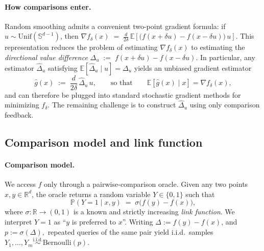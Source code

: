 \documentclass[11pt]{article}
\theoremstyle{plain}
\theoremstyle{remark}
\newcommand{\R}{\mathbb{R}}
\newcommand{\E}{\mathbb{E}}
\newcommand{\Prob}{\mathbb{P}}
\newcommand{\1}{\mathbf{1}}
\begin{document}
\paragraph{How comparisons enter.}
Random smoothing admits a convenient two-point gradient formula: if
$u\sim \mathrm{Unif}(\mathbb S^{d-1})$, then
$
\nabla f_\delta(x)
\;=\;
\frac{d}{2\delta}\,
\E\!\left[\big(f(x+\delta u)-f(x-\delta u)\big)\,u\right].
$
This representation reduces the problem of estimating $\nabla f_\delta(x)$ to estimating the
\emph{directional value difference}
$
\Delta_u \;:=\; f(x+\delta u)-f(x-\delta u).
$
In particular, any estimator $\widehat{\Delta}_u$ satisfying
$\E[\widehat{\Delta}_u\mid u]=\Delta_u$ yields an unbiased gradient estimator
\[
\widehat g(x)
\;:=\;
\frac{d}{2\delta}\,\widehat{\Delta}_u\,u,
\qquad\text{so that}\qquad
\E[\widehat g(x)\mid x]=\nabla f_\delta(x),
\]
and can therefore be plugged into standard stochastic gradient methods for minimizing $f_\delta$. The remaining challenge is to construct $\widehat{\Delta}_u$ using only comparison feedback.

















\subsection{Comparison model and link function}
\label{sec:link_model}

\paragraph{Comparison model.}
We access $f$ only through a pairwise-comparison oracle. Given any two points $x,y\in\R^d$, the
oracle returns a random variable $Y\in\{0,1\}$ such that
\[
\Prob(Y=1 \mid x,y) \;=\; \sigma\!\big(f(y)-f(x)\big),
\]
where $\sigma:\R\to(0,1)$ is a known and strictly increasing \emph{link function}. We interpret
$Y=1$ as ``$y$ is preferred to $x$''. Writing
$
\Delta := f(y)-f(x)$, and $
p := \sigma(\Delta),
$
repeated queries of the same pair yield i.i.d.\ samples
$Y_1,\dots,Y_m \overset{\mathrm{i.i.d.}}{\sim} \mathrm{Bernoulli}(p)$.
\end{document}
